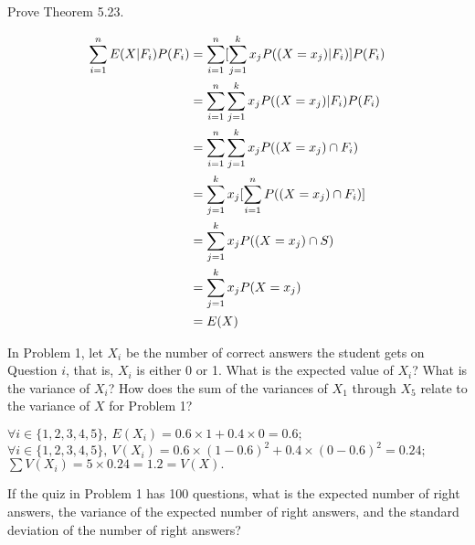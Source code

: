\documentclass[12pt, a4paper, UTF8]{ctexart}
\begin{document}
\begin{problem}[CS: 5.6.8]
  Prove Theorem 5.23.
\end{problem}

\begin{solution}
  \begin{align}
      \sum_{i=1}^{n} E(X|F_{i})P(F_{i}) & = \sum_{i=1}^{n} [\sum_{j=1}^{k} x_{j}P((X=x_{j})|F_{i})]P(F_{i}) \notag \\
             & = \sum_{i=1}^{n}\sum_{j=1}^{k} x_{j}P((X=x_{j})|F_{i})P(F_{i}) \notag \\
             & = \sum_{i=1}^{n}\sum_{j=1}^{k} x_{j}P((X=x_{j})\cap F_{i}) \notag \\
             & = \sum_{j=1}^{k} x_{j}[\sum_{i=1}^{n} P((X=x_{j})\cap F_{i})] \notag \\
             & = \sum_{j=1}^{k} x_{j}P((X=x_{j})\cap S) \notag \\
             & = \sum_{j=1}^{k} x_{j}P(X=x_{j}) \notag \\
             & = E(X) \notag
  \end{align}
\end{solution}
\begin{problem}[CS: 5.7.2]
  In Problem 1, let $X_{i}$ be the number of correct answers the student gets on 
  Question $i$, that is, $X_{i}$ is either 0 or 1. What is the expected value of 
  $X_{i}$? What is the variance of $X_{i}$? How does the sum of the variances of 
  $X_{1}$ through $X_{5}$ relate to the variance of $X$ for Problem 1?
\end{problem}


\begin{solution}
  $\forall i \in \{ 1,2,3,4,5 \},~E(X_{i}) = 0.6\times 1 + 0.4\times 0 = 0.6;$\\
  $\forall i \in \{ 1,2,3,4,5 \},~V(X_{i}) = 0.6\times(1-0.6)^{2} + 0.4\times(0-0.6)^{2} = 0.24;$\\
  $\sum V(X_{i}) = 5\times 0.24 = 1.2 = V(X).$
\end{solution}

\begin{problem}[CS: 5.7.4]
  If the quiz in Problem 1 has 100 questions, what is the expected number of right 
  answers, the variance of the expected number of right answers, and the standard 
  deviation of the number of right answers?
\end{problem}
\end{document}
